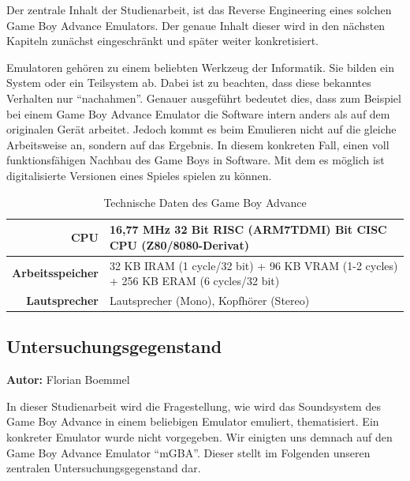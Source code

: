 \documentclass[11pt,a4paper]{scrartcl}
\newcommand{\AutorFlorian} {
    \vspace{-4mm}
    \large \textbf{Autor:} Florian Boemmel \normalsize
    \vspace{2mm}
}
\begin{document}
Der zentrale Inhalt der Studienarbeit, ist das Reverse Engineering eines solchen Game Boy Advance Emulators. Der genaue Inhalt dieser wird in den n\"achsten Kapiteln zun\"achst eingeschr\"ankt und sp\"ater weiter konkretisiert.

Emulatoren geh\"oren zu einem beliebten Werkzeug der Informatik. Sie bilden ein System oder ein Teilsystem ab. Dabei ist zu beachten, dass diese bekanntes Verhalten nur \enquote{nachahmen}. Genauer ausgef\"uhrt bedeutet dies, dass zum Beispiel bei einem Game Boy Advance Emulator die Software intern anders als auf dem originalen Ger\"at arbeitet. Jedoch kommt es beim Emulieren nicht auf die gleiche Arbeitsweise an, sondern auf das Ergebnis. In diesem konkreten Fall, einen voll funktionsf\"ahigen Nachbau des Game Boys in Software. Mit dem es m\"oglich ist digitalisierte Versionen eines Spieles spielen zu k\"onnen.\newline

\begin{table}[h]
    \centering
    \begin{tabular}{ r | p{10cm} }
        \textbf{CPU} & 16,77 MHz 32 Bit RISC (ARM7TDMI)\newline
              8 Bit CISC CPU (Z80/8080-Derivat) \\
        \hline
        \textbf{Arbeitsspeicher} & 32 KB IRAM (1 cycle/32 bit)\newline
                          + 96 KB VRAM (1-2 cycles)\newline
                          + 256 KB ERAM (6 cycles/32 bit) \\
        \hline
        \textbf{Lautsprecher} & Lautsprecher (Mono), Kopfh\"orer (Stereo) \\
    \end{tabular}
    \caption{Technische Daten des Game Boy Advance \cite{GameBoyTechnischeDaten}}
    \label{table:TechnischeDaten}
\end{table}

\newpage

\subsection{Untersuchungsgegenstand}
\AutorFlorian

In dieser Studienarbeit wird die Fragestellung, wie wird das Soundsystem des Game Boy Advance in einem beliebigen Emulator emuliert, thematisiert. Ein konkreter Emulator wurde nicht vorgegeben. Wir einigten uns demnach auf den Game Boy Advance Emulator \enquote{mGBA}. Dieser stellt im Folgenden unseren zentralen Untersuchungsgegenstand dar.
\end{document}
